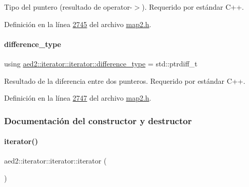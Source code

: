 Tipo del puntero (resultado de operator-\/$>$). Requerido por estándar C++. 



Definición en la línea \hyperlink{map2_8h_source_l02745}{2745} del archivo \hyperlink{map2_8h_source}{map2.\+h}.

\mbox{\label{classaed2_1_1iterator_1_1iterator_a7dc57879d054ca0168a20003c9d655b6_a7dc57879d054ca0168a20003c9d655b6}} 
\paragraph{\texorpdfstring{difference\+\_\+type}{difference\_type}}
{\footnotesize\ttfamily using \hyperlink{classaed2_1_1iterator_1_1iterator_a7dc57879d054ca0168a20003c9d655b6_a7dc57879d054ca0168a20003c9d655b6}{aed2\+::iterator\+::iterator\+::difference\+\_\+type} =  std\+::ptrdiff\+\_\+t}



Resultado de la diferencia entre dos punteros. Requerido por estándar C++. 



Definición en la línea \hyperlink{map2_8h_source_l02747}{2747} del archivo \hyperlink{map2_8h_source}{map2.\+h}.



\subsubsection{Documentación del constructor y destructor}
\mbox{\label{classaed2_1_1iterator_1_1iterator_ae488782067dfba96b447080b0db1ed2c_ae488782067dfba96b447080b0db1ed2c}} 
\paragraph{\texorpdfstring{iterator()}{iterator()}\hspace{0.1cm}{\footnotesize\ttfamily [1/2]}}
{\footnotesize\ttfamily aed2\+::iterator\+::iterator\+::iterator (\begin{DoxyParamCaption}{ }\end{DoxyParamCaption})\hspace{0.3cm}{\ttfamily [inline]}}



